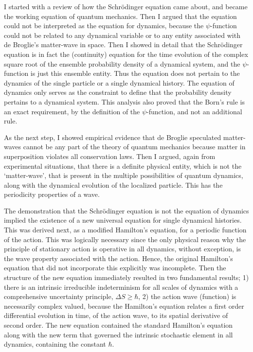 I started with a review of how the Schr\"{o}dinger equation came about, and became the
working equation of quantum mechanics. Then I argued that the equation could not be
interpreted as the equation for dynamics, because the $\psi$-function could not be related to
any dynamical variable or to any entity associated with de Broglie's matter-wave in space.
Then I showed in detail that the Schr\"{o}dinger equation is in fact the (continuity) equation
for the time evolution of the complex square root of the ensemble probability density of a
dynamical system, and the $\psi$-function is just this ensemble entity. Thus the equation does
not pertain to the dynamics of the single particle or a single dynamical history. The equation
of dynamics only serves as the constraint to define that the probability density pertains to
a dynamical system. This analysis also proved that the Born's rule is an exact requirement,
by the definition of the $\psi$-function, and not an additional rule.

As the next step, I showed empirical evidence that de Broglie speculated matter-waves
cannot be any part of the theory of quantum mechanics because matter in superposition
violates all conservation laws. Then I argued, again from experimental situations, that there
is a definite physical entity, which is not the `matter-wave', that is present in the multiple
possibilities of quantum dynamics, along with the dynamical evolution of the localized particle. 
This has the periodicity properties of a wave.

The demonstration that the Schr\"{o}dinger equation is not the equation of dynamics implied
the existence of a new universal equation for single dynamical histories. This was derived
next, as a modified Hamilton's equation, for a periodic function of the action. This was
logically necessary since the only physical reason why the principle of stationary action
is operative in all dynamics, without exception, is the wave property associated with the action. Hence, the
original Hamilton's equation that did not incorporate this explicitly was incomplete. Then
the structure of the new equation immediately resulted in two fundamental results; 1) there
is an intrinsic irreducible indeterminism for all scales of dynamics with a comprehensive
uncertainty principle, $\Delta S \geq  \hbar$, 2) the action wave (function) is necessarily complex valued,
because the Hamilton's equation relates a first order differential evolution in time, of the
action wave, to its spatial derivative of second order. The
new equation contained the standard Hamilton's equation along with the new term that
governed the intrinsic stochastic element in all dynamics, containing the constant $\hbar$.

